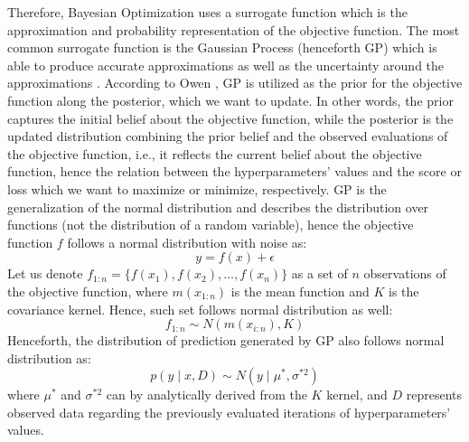 Therefore, Bayesian Optimization uses a surrogate function which is the approximation and probability representation of the objective function. The most common surrogate function is the Gaussian Process (henceforth GP) which is able to produce accurate approximations as well as the uncertainty around the approximations \citep{wang2020bayesian}.
According to Owen \citep{owen2022hyperparameter}, GP is utilized as the prior for the objective function along the posterior, which we want to update.
In other words, the prior captures the initial belief about the objective function, while the posterior is the updated distribution combining the prior belief and the observed evaluations of the objective function, i.e., it reflects the current belief about the objective function, hence the relation between the hyperparameters' values and the score or loss which we want to maximize or minimize, respectively.
GP is the generalization of the normal distribution and describes the distribution over functions (not the distribution of a random variable), hence the objective function $f$ follows a normal distribution with noise as:
\begin{equation}\label{eq}
    y = f\left(x\right) + \epsilon
\end{equation}
Let us denote $f_{1:n} = \{ f\left(x_1\right), f\left(x_2\right), \ldots, f\left(x_n\right)\}$ as a set of $n$ observations of the objective function, where $m\left(x_{1:n}\right)$ is the mean function and $K$ is the covariance kernel. Hence, such set follows normal distribution as well:
\begin{equation}\label{eq}
    f_{1:n} \sim N\left(m\left(x_{i:n}\right), K\right)
\end{equation}
Henceforth, the distribution of prediction generated by GP also follows normal distribution as:
\begin{equation}\label{eq}
    p\left(y \mid x, D\right) \sim N\left(y \mid \mu^{*}, \sigma^{*2}\right)
\end{equation}
where $\mu^{*}$ and $\sigma^{*2}$ can by analytically derived from the $K$ kernel, and $D$ represents observed data regarding the previously evaluated iterations of hyperparameters' values.

